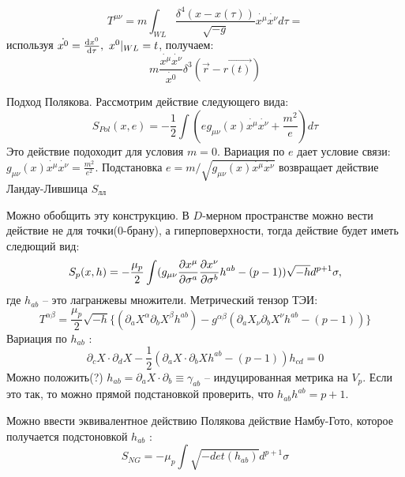 \documentclass[a4paper]{article}
\begin{document}
\begin{equation}
T^{\mu \nu} = m \int_{WL} \frac{\delta^4 ( x - x(\tau))}{\sqrt{-g}} \dot{x^\mu} \dot{x^\nu} d\tau=
\end{equation}
используя $ \dot{x^0} = \dv{x^0}{\tau}, {~} x^0 |_{WL} = t$, получаем:
\begin{equation}
m \frac{\dot{x^\mu} \dot{x^\nu}}{\dot{x^0}} \delta^3( \vec{r} - \vec{r(t)})
\end{equation}
\par
Подход Полякова. Рассмотрим действие следующего вида:
\begin{equation}
S_{Pol}(x, e) = - \frac{1}{2} \int ( e g_{\mu \nu}(x) \dot{x^\mu} \dot{x^\nu} + \frac{m^2}{e}) d\tau
\end{equation}
Это действие подоходит для условия $m=0$. Вариация по $e$ дает условие связи: $ g_{\mu \nu}(x) \dot{x^\mu} \dot{x^\nu} = \frac{m^2}{e^2}$. Подстановка $e = m/ \sqrt{g_{\mu \nu}(x) \dot{x^\mu} \dot{x^\nu}} $ возвращает действие Ландау-Лившица $S_{\text{лл}}$
\par
Можно обобщить эту конструкцию. В $D$-мерном пространстве можно вести действие не для точки($0$-брану), а гиперповерхности, тогда действие  будет иметь следющий вид:
\begin{equation}
S_{p} (x, h) = -\frac{\mu_p}{2} \int (g_{\mu \nu} \pdv{x^\mu}{\sigma^a} \pdv{x^\nu}{\sigma^b} h^{ab} - (p-1)) \sqrt{-h} d^{p+1} \sigma,
\end{equation}
где $h_{ab}$ -- это лагранжевы множители. Метрический тензор ТЭИ:
\begin{equation}
T^{\alpha \beta} = \frac{\mu_p}{2} \sqrt{-h}\lbrace(\partial_a X^{\alpha} \partial_b X^{\beta} h^{ab}) - g^{\alpha \beta}(\partial_a X_\nu \partial_b X^\nu h^{ab} - (p-1)) \rbrace
\end{equation}
Вариация по $h_{ab}$ :
\begin{equation}
\partial_c X \cdot \partial_d X  - \frac{1}{2}( \partial_a X \cdot \partial_b X h^{ab} - (p-1)) h_{cd} = 0
\end{equation}
Можно положить(?) $h_{ab} =  \partial_a X \cdot \partial_b \equiv \gamma_{ab}$ -- индуцированная метрика на $V_p$. Если это так, то можно прямой подстановкой проверить, что $h_{ab} h^{ab} = p+1$. 
\par 
Можно ввести эквивалентное действию Полякова действие Намбу-Гото, которое получается подстоновкой $h_{ab}$ :
\begin{equation}
S_{NG} = - \mu_p \int \sqrt{-det(h_{ab})} d^{p+1} \sigma
\end{equation}
\end{document}
